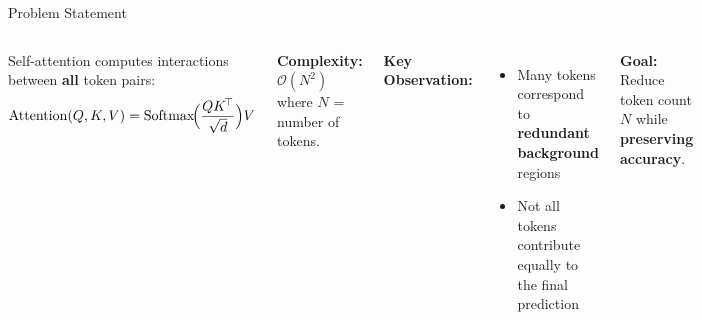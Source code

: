 \documentclass[aspectratio=169, 11pt]{beamer}
\begin{document}
\begin{frame}{Problem Statement}
\begin{columns}[T]
Self-attention computes interactions between \textbf{all} token pairs:
\[
  \mathrm{Attention}(Q,K,V)
  = \mathrm{Softmax}\!\Bigl(\frac{QK^{\!\top}}{\sqrt{d}}\Bigr)V
\]

\textbf{Complexity:} $\mathcal{O}(N^{2})$ where $N$ = number of tokens.

\vspace{0.3cm}
\textbf{Key Observation:}
\begin{itemize}
  \item Many tokens correspond to \textbf{redundant background} regions
  \item Not all tokens contribute equally to the final prediction
\end{itemize}

\vspace{0.3cm}
\textbf{Goal:} Reduce token count $N$ while \textbf{preserving accuracy}.

\begin{center}
\end{center}
\end{columns}
\end{frame}
\end{document}
